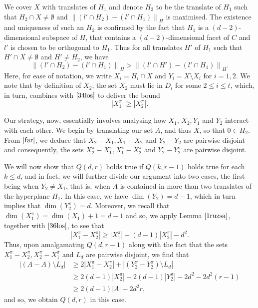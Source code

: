 We cover $X$ with translates of $H_1$ and denote $H_2$ to be the translate of $H_1$ such that $H_2 \cap X \neq \emptyset$ and ${\| (l' \cap H_2) - (l' \cap H_1) \|}_{H}$ is maximised. The existence and uniqueness of such an $H_2$ is confirmed by the fact that $H_1$ is a $(d-2)$-dimensional subspace of $H$, that contains a $(d-2)$-dimensional facet of $C$ and $l'$ is chosen to be orthogonal to $H_1$. 
Thus for all translates $H'$ of $H_1$ such that $H' \cap X \neq \emptyset$ and $H' \neq H_2$, we have
\begin{equation}  \label{far}
{\| (l' \cap H_2) - (l' \cap H_1) \|}_{H} > {\| (l' \cap H') - (l' \cap H_1) \|}_{H}.
\end{equation}
Here, for ease of notation, we write $X_i = H_i \cap X$ and $Y_i = X \setminus X_i$ for $i=1,2$. We note that by definition of $X_2$, the set $X_2$ must lie in $D_i$ for some $2 \leq i \leq t$, which, in turn, combines with $\eqref{34los}$ to deliver the bound
\begin{equation} \label{36los}
|X_1^{\pi}| \geq |X_2^{\pi}|. 
\end{equation}
\par

Our strategy, now, essentially involves analysing how $X_1$, $X_2, Y_1$ and $Y_2$ interact with each other. We begin by translating our set $A$, and thus $X$, so that $0 \in H_2$. From $\eqref{far}$, we deduce that $X_2 - X_1, X_1 - X_2$ and $Y_2 - Y_2$ are pairwise disjoint and consequently, the sets $X_2^{\pi} - X_1^{\pi}, X_1^{\pi} - X_2^{\pi}$ and $Y_2^{\pi} - Y_2^{\pi}$ are pairwise disjoint. 
\par

We will now show that $Q(d,r)$ holds true if $Q(k,r-1)$ holds true for each $k \leq d$, and in fact, we will further divide our argument into two cases, the first being when $Y_2 \neq X_1$, that is, when $A$ is contained in more than two translates of the hyperplane $H_1$. In this case, we have $\dim(Y_2) = d-1$, which in turn implies that $\dim(Y_2^{\pi}) = d$. Moreover, we recall that $\dim(X_1^{\pi}) = \dim(X_1) + 1 = d-1$ and so, we apply Lemma $\ref{1ruzsa}$, together with $\eqref{36los}$, to see that
\begin{equation} \label{ind1}
 |X_1^{\pi} - X_2^{\pi}| \geq |X_1^{\pi}|  + (d-1)|X_2^{\pi}|  - d^2. 
 \end{equation}
Thus, upon amalgamating $Q(d,r-1)$ along with the fact that the sets $X_1^{\pi} - X_2^{\pi}, X_2^{\pi} - X_1^{\pi} $ and $L_{d}$ are pairwise disjoint, we find that
 \begin{align*}
 |(A-A) \setminus L_d| & \geq 2|X_1^{\pi} - X_2^{\pi}| + |(Y_2^{\pi} - Y_2^{\pi})\setminus L_d| \\
 & \geq 2(d-1)|X_2^{\pi}| + 2(d-1)|Y_2^{\pi}| - 2d^2 - 2d^2(r-1)  \\
 & \geq 2(d-1) |A| - 2d^2 r,
 \end{align*}
and so, we obtain $Q(d,r)$ in this case.
\par


